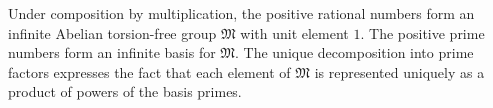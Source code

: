 Under composition by multiplication, the positive rational numbers form an infinite Abelian torsion-free group $\mathfrak{M}$ with unit element $1$. The positive prime numbers form an infinite basis for $\mathfrak{M}$. The unique decomposition into prime factors expresses the fact that each element of $\mathfrak{M}$ is represented uniquely as a product of powers of the basis primes.
